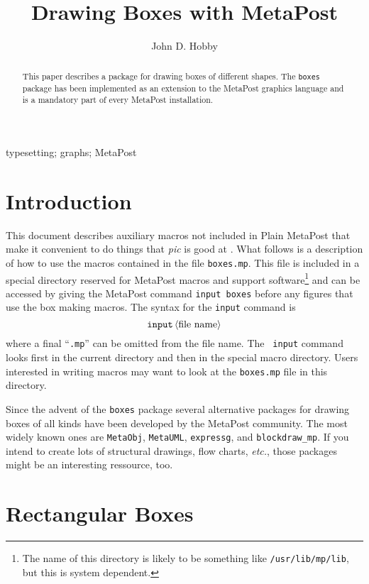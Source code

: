 \documentclass{article} %
\author{John D. Hobby}
\title{Drawing Boxes with {MetaPost}}
\date{}
\newcommand\descr[1]{{\langle\hbox{\rm#1}\rangle}}
\newcommand\myabstract{%
  This paper describes a package for drawing boxes of different shapes.
  The \texttt{boxes} package has been implemented as an extension to the
  MetaPost graphics language and is a mandatory part of every MetaPost
  installation.}
\newcommand\mykeywords{%
    typesetting; graphs; MetaPost}
\begin{document}
  \maketitle
  \begin{abstract} \myabstract \end{abstract}
  \ifx\keywords\undefined \else
    \begin{keywords} \mykeywords \end{keywords}
  \fi

\setlength{\columnsep}{2.5em}
\begin{multicols}{2}
\tableofcontents
\end{multicols}


\section{Introduction}
\label{intro}

This document describes auxiliary macros not included in Plain MetaPost
that make it convenient to do things that {\it pic} is good at
\cite{ke:pic}.  What follows is a description of how to use the macros
contained in the file {\tt boxes.mp}.
This file is included in a special directory reserved for MetaPost
macros and support software\footnote{The name of this directory is
  likely to be something like \texttt{/usr/lib/mp/lib}, but this is
  system dependent.}  and can be accessed by giving the MetaPost command
{\tt input boxes} before any figures that use the box making macros.
The syntax for the {\tt input} command is 
$$ {\tt input}\, \descr{file name} $$
where a final ``{\tt .mp}'' can be omitted from the file name.  The {\tt
  input} command looks first in the current directory and then in the
special macro directory.  Users interested in writing macros may want to
look at the {\tt boxes.mp} file in this directory.

Since the advent of the \texttt{boxes} package several alternative
packages for drawing boxes of all kinds have been developed by the
MetaPost community.  The most widely known ones are
\texttt{MetaObj},
\texttt{MetaUML},
\texttt{expressg}, and
\texttt{blockdraw\_mp}.  If
you intend to create lots of structural drawings, flow charts,
\emph{etc.}, those packages might be an interesting ressource, too.


\section{Rectangular Boxes}
\label{rectbox}
\end{document}
